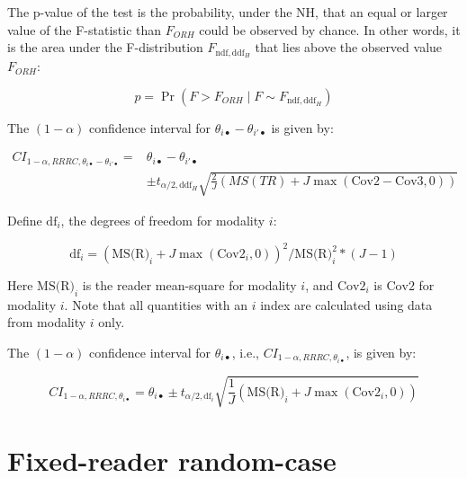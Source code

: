 \documentclass[
]{book}
\begin{document}
The p-value of the test is the probability, under the NH, that an equal or larger value of the F-statistic than \(F_{ORH}\) could be observed by chance. In other words, it is the area under the F-distribution \(F_{\text{ndf},\text{ddf}_H}\) that lies above the observed value \(F_{ORH}\):

\begin{equation}
p=\Pr(F>F_{ORH} \mid F\sim F_{\text{ndf},\text{ddf}_H})
\label{eq:pValueOR-RRRC}
\end{equation}

The \((1-\alpha)\) confidence interval for \(\theta_{i \bullet} - \theta_{i' \bullet}\) is given by:

\begin{equation}
\begin{split}
CI_{1-\alpha,RRRC,\theta_{i \bullet} - \theta_{i' \bullet}} =& \theta_{i \bullet} - \theta_{i' \bullet} \\ 
&\pm t_{\alpha/2, \text{ddf}_H}\sqrt{\textstyle\frac{2}{J}(MS(TR)+J\max(\text{Cov2}-\text{Cov3},0))}
\end{split}
\label{eq:CI-DiffFomRRRC}
\end{equation}

Define \(\text{df}_i\), the degrees of freedom for modality \(i\):

\begin{equation}
\text{df}_i = (\text{MS(R)}_i + J\max(\text{Cov2}_{i}, 0))^2/\text{MS(R)}_i^2 * (J - 1)
\label{eq:CI-RRRC-df-IndvlTrt}
\end{equation}

Here \(\text{MS(R)}_i\) is the reader mean-square for modality \(i\), and \(\text{Cov2}_i\) is \(\text{Cov2}\) for modality \(i\). Note that all quantities with an \(i\) index are calculated using data from modality \(i\) only.

The \((1-\alpha)\) confidence interval for \(\theta_{i \bullet}\), i.e., \(CI_{1-\alpha,RRRC,\theta_{i \bullet}}\), is given by:

\begin{equation}
CI_{1-\alpha,RRRC,\theta_{i \bullet}} = \theta_{i \bullet} \pm t_{\alpha/2, \text{df}_i}\sqrt{\textstyle\frac{1}{J}(\text{MS(R)}_i + J\max(\text{Cov2}_{i}, 0))}
\label{eq:CI-RRRC-IndvlTrt}
\end{equation}

\hypertarget{or-analysis-st-frrc}{%
\section{Fixed-reader random-case}\label{or-analysis-st-frrc}}
\end{document}
